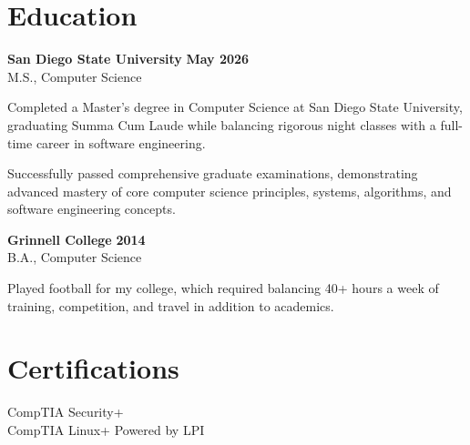 \documentclass[10pt,letterpaper]{article}
\begin{document}
\section*{Education}

\textbf{San Diego State University} \hfill \textbf{May 2026} \\
M.S., Computer Science

\vspace{3pt}
Completed a Master's degree in Computer Science at San Diego State University, graduating Summa Cum Laude while balancing rigorous night classes with a full-time career in software engineering.

\vspace{3pt}
Successfully passed comprehensive graduate examinations, demonstrating advanced mastery of core computer science principles, systems, algorithms, and software engineering concepts.

\vspace{6pt}

\textbf{Grinnell College} \hfill \textbf{2014} \\
B.A., Computer Science

\vspace{3pt}
Played football for my college, which required balancing 40+ hours a week of training, competition, and travel in addition to academics.

\section*{Certifications}

CompTIA Security+ \\
CompTIA Linux+ Powered by LPI
\end{document}
